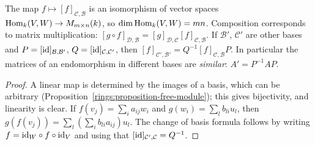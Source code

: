 \begin{proposition}\label{linear-algebra:proposition-matrices}
The map $f \mapsto [f]_{\mathcal{C}, \mathcal{B}}$ is an isomorphism of vector spaces
$\operatorname{Hom}_k(V, W) \to M_{m \times n}(k)$, so $\dim \operatorname{Hom}_k(V, W) = mn$. Composition corresponds to matrix
multiplication: $[g \circ f]_{\mathcal{D}, \mathcal{B}} = [g]_{\mathcal{D}, \mathcal{C}}[f]_{\mathcal{C}, \mathcal{B}}$. If
$\mathcal{B}'$, $\mathcal{C}'$ are other bases and $P = [\mathrm{id}]_{\mathcal{B}, \mathcal{B}'}$,
$Q = [\mathrm{id}]_{\mathcal{C}, \mathcal{C}'}$, then $[f]_{\mathcal{C}', \mathcal{B}'} = Q^{-1}[f]_{\mathcal{C}, \mathcal{B}}P$.
In particular the matrices of an endomorphism in different bases are \emph{similar}:
$A' = P^{-1}AP$.
\end{proposition}

\begin{proof}
A linear map is determined by the images of a basis, which can be arbitrary
(Proposition~\ref{rings:proposition-free-module}); this gives bijectivity, and linearity is clear.
If $f(v_j) = \sum_i a_{ij}w_i$ and $g(w_i) = \sum_l b_{li}u_l$, then
$g(f(v_j)) = \sum_l (\sum_i b_{li}a_{ij}) u_l$. The change of basis formula follows by writing
$f = \mathrm{id}_W \circ f \circ \mathrm{id}_V$ and using that $[\mathrm{id}]_{\mathcal{C}', \mathcal{C}} = Q^{-1}$.
\end{proof}


